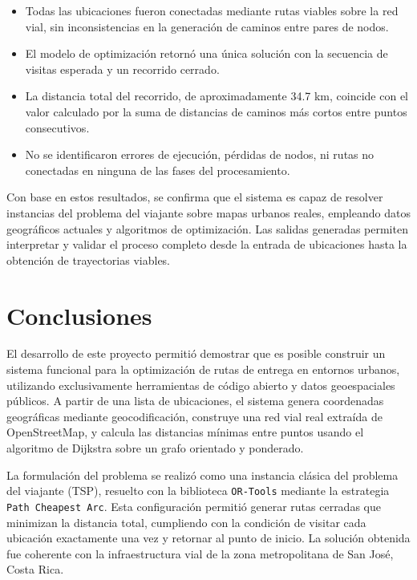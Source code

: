 \documentclass[a4paper,12pt]{article}
\begin{document}
\begin{itemize}
    \item Todas las ubicaciones fueron conectadas mediante rutas viables sobre la red vial, sin inconsistencias en la generación de caminos entre pares de nodos.
    \item El modelo de optimización retornó una única solución con la secuencia de visitas esperada y un recorrido cerrado.
    \item La distancia total del recorrido, de aproximadamente 34.7 km, coincide con el valor calculado por la suma de distancias de caminos más cortos entre puntos consecutivos.
    \item No se identificaron errores de ejecución, pérdidas de nodos, ni rutas no conectadas en ninguna de las fases del procesamiento.
\end{itemize}

Con base en estos resultados, se confirma que el sistema es capaz de resolver instancias del problema del viajante sobre mapas urbanos reales, empleando datos geográficos actuales y algoritmos de optimización. Las salidas generadas permiten interpretar y validar el proceso completo desde la entrada de ubicaciones hasta la obtención de trayectorias viables.

\newpage
\section{Conclusiones}

El desarrollo de este proyecto permitió demostrar que es posible construir un sistema funcional para la optimización de rutas de entrega en entornos urbanos, utilizando exclusivamente herramientas de código abierto y datos geoespaciales públicos. A partir de una lista de ubicaciones, el sistema genera coordenadas geográficas mediante geocodificación, construye una red vial real extraída de OpenStreetMap, y calcula las distancias mínimas entre puntos usando el algoritmo de Dijkstra sobre un grafo orientado y ponderado.

La formulación del problema se realizó como una instancia clásica del problema del viajante (TSP), resuelto con la biblioteca \texttt{OR-Tools} mediante la estrategia \texttt{Path Cheapest Arc}. Esta configuración permitió generar rutas cerradas que minimizan la distancia total, cumpliendo con la condición de visitar cada ubicación exactamente una vez y retornar al punto de inicio. La solución obtenida fue coherente con la infraestructura vial de la zona metropolitana de San José, Costa Rica.
\end{document}
